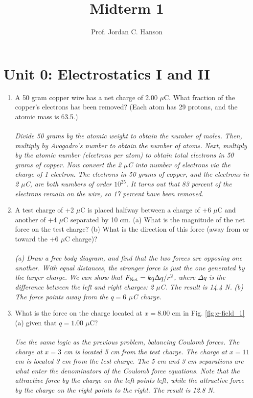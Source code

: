 \documentclass[12pt,twocolumn]{article}
\title{Midterm 1}
\author{Prof. Jordan C. Hanson}
\begin{document}
\maketitle
\small

\section{Unit 0: Electrostatics I and II}

\noindent
\begin{enumerate}
\item A 50 gram copper wire has a net charge of 2.00 $\mu$C. What fraction of the copper’s electrons has been removed? (Each atom has 29 protons, and the atomic mass is 63.5.) \\ \\
\textit{Divide 50 grams by the atomic weight to obtain the number of moles.  Then, multiply by Avogadro's number to obtain the number of atoms.  Next, multiply by the atomic number (electrons per atom) to obtain total electrons in 50 grams of copper.  Now convert the 2 $\mu$C into number of electrons via the charge of 1 electron.  The electrons in 50 grams of copper, and the electrons in 2 $\mu$C, are both numbers of order $10^{25}$.  It turns out that 83 percent of the electrons remain on the wire, so 17 percent have been removed.}
\item A test charge of +2 $\mu$C is placed halfway between a charge of +6 $\mu$C and another of +4 $\mu$C separated by 10 cm. (a) What is the magnitude of the net force on the test charge? (b) What is the direction of this force (away from or toward the +6 $\mu$C charge)? \\ \\
\textit{(a) Draw a free body diagram, and find that the two forces are opposing one another.  With equal distances, the stronger force is just the one generated by the larger charge.  We can show that $F_{\rm Net} = k q \Delta q/r^2$, where $\Delta q$ is the difference between the left and right charges: 2 $\mu$C.  The result is 14.4 N. (b) The force points away from the $q = 6$ $\mu$C charge.}
\item What is the force on the charge located at $x=8.00$ cm in Fig. \ref{fig:e-field_1}(a) given that $q=1.00$ $\mu$C? \\ \\
\textit{Use the same logic as the previous problem, balancing Coulomb forces.  The charge at $x=3$ cm is located 5 cm from the test charge.  The charge at $x=11$ cm is located 3 cm from the test charge.  The 5 cm and 3 cm separations are what enter the denominators of the Coulomb force equations.  Note that the attractive force by the charge on the left points left, while the attractive force by the charge on the right points to the right.  The result is 12.8 N.}

\end{enumerate}
\end{document}
